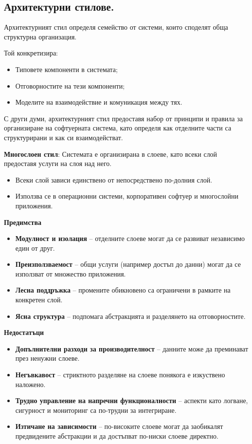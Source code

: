 \documentclass{article}
\renewcommand{\\}{\newline}
\begin{document}
\subsection{Архитектурни стилове.}

Архитектурният стил определя семейство от системи, които споделят обща структурна организация.

Той конкретизира:

\begin{itemize}
  \item Типовете компоненти в системата;
  \item Отговорностите на тези компоненти;
  \item Моделите на взаимодействие и комуникация между тях.
\end{itemize}

С други думи, архитектурният стил предоставя набор от принципи и правила за организиране на софтуерната система, като определя как отделните части са структурирани и как си взаимодействат.

\textbf{Многослоен стил}: Системата е организирана в слоеве, като всеки слой предоставя услуги на слоя над него.

\begin{itemize}
    \item Всеки слой зависи единствено от непосредствено по-долния слой.
    \item Използва се в операционни системи, корпоративен софтуер и многослойни приложения.
\end{itemize}

\textbf{Предимства}

\begin{itemize}
    \item \textbf{Модулност и изолация} – отделните слоеве могат да се развиват независимо един от друг.
    \item \textbf{Преизползваемост} – общи услуги (например достъп до данни) могат да се използват от множество приложения.
    \item \textbf{Лесна поддръжка} – промените обикновено са ограничени в рамките на конкретен слой.
    \item \textbf{Ясна структура} – подпомага абстракцията и разделянето на отговорностите.
\end{itemize}

\textbf{Недостатъци}

\begin{itemize}
    \item \textbf{Допълнителни разходи за производителност} – данните може да преминават през ненужни слоеве.
    \item \textbf{Негъвкавост} – стриктното разделяне на слоеве понякога е изкуствено наложено.
    \item \textbf{Трудно управление на напречни функционалности} – аспекти като логване, сигурност и мониторинг са по-трудни за интегриране.
    \item \textbf{Изтичане на зависимости} – по-високите слоеве могат да заобикалят предвидените абстракции и да достъпват по-ниски слоеве директно.
\end{itemize}
\end{document}
